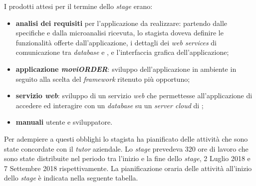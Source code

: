 I prodotti attesi per il termine dello \textit{stage} erano:
\begin{itemize}
	\item \textbf{analisi dei requisiti} per l'applicazione da realizzare: partendo dalle specifiche e dalla microanalisi ricevuta, lo stagista doveva definire le funzionalità offerte dall'applicazione, i dettagli dei \textit{web services} di comunicazione tra \textit{database} e , e l'interfaccia grafica dell'applicazione;
	\item \textbf{applicazione \textit{moviORDER}}: sviluppo dell'applicazione in ambiente  in seguito alla scelta del \textit{framework} ritenuto più opportuno;
	\item \textbf{servizio \textit{web}}: sviluppo di un servizio \textit{web} che permettesse all'applicazione di accedere ed interagire con un \textit{database} su un \textit{server cloud} di \visione{};
	\item \textbf{manuali} utente e sviluppatore. 
\end{itemize}

Per adempiere a questi obblighi lo stagista ha pianificato delle attività che sono state concordate con il \textit{tutor} aziendale. Lo \textit{stage} prevedeva 320 ore di lavoro che sono state distribuite nel periodo tra l'inizio e la fine dello \textit{stage}, 2 Luglio 2018 e 7 Settembre 2018 rispettivamente. La pianificazione oraria delle attività all'inizio dello \textit{stage} è indicata nella seguente tabella.

